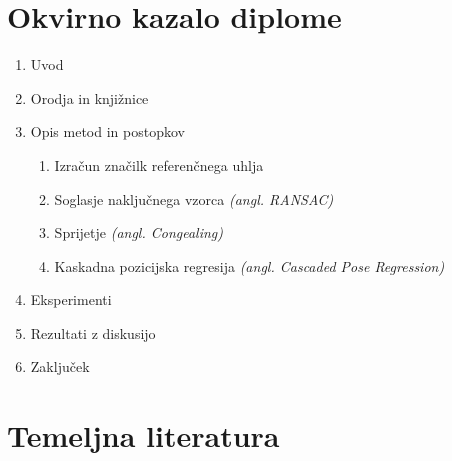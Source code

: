 \documentclass[11pt,a4paper]{article}
\begin{document}
\section{Okvirno kazalo diplome}

\begin{enumerate}
\item Uvod
\item Orodja in knjižnice
\item Opis metod in postopkov
\begin{enumerate}
		  	\item{Izračun značilk referenčnega uhlja}
          \item{Soglasje naključnega vzorca \emph{(angl. RANSAC)} \cite{fischler1981random}}
          \item{Sprijetje \emph{(angl. Congealing)} \cite{huang2007unsupervised}}
          \item{Kaskadna pozicijska regresija \emph{(angl. Cascaded Pose Regression)} \cite{pflug2015ear}} 
\end{enumerate}
\item Eksperimenti
\item{Rezultati z diskusijo}
\item{Zaklju\v cek}
\end{enumerate}

\section{Temeljna literatura}

\printbibliography
\end{document}
